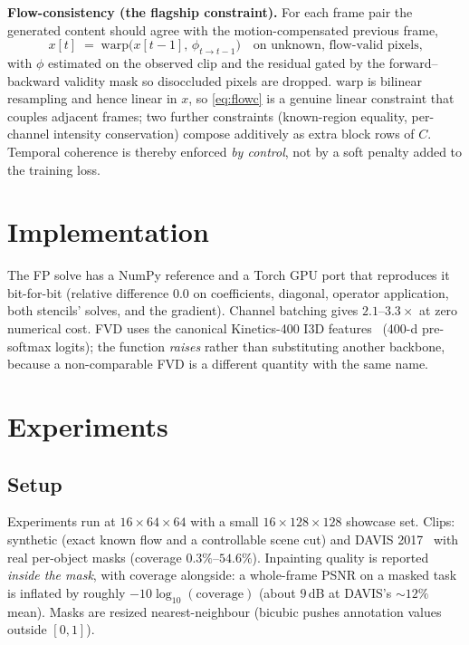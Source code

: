 \medskip\noindent\textbf{Flow-consistency (the flagship constraint).} For each
frame pair the generated content should agree with the motion-compensated
previous frame,
\begin{equation}
  x[t] \;=\; \mathrm{warp}\big(x[t{-}1],\,\phi_{t\to t-1}\big)
  \quad\text{on unknown, flow-valid pixels,}
  \label{eq:flowc}
\end{equation}
with $\phi$ estimated on the observed clip and the residual gated by the
forward--backward validity mask so disoccluded pixels are dropped. $\mathrm{warp}$
is bilinear resampling and hence linear in $x$, so \eqref{eq:flowc} is a genuine
linear constraint that couples adjacent frames; two further constraints
(known-region equality, per-channel intensity conservation) compose additively as
extra block rows of $C$. Temporal coherence is thereby enforced \emph{by control},
not by a soft penalty added to the training loss.

\section{Implementation}
The FP solve has a NumPy reference and a Torch GPU port that reproduces it
bit-for-bit (relative difference $0.0$ on coefficients, diagonal, operator
application, both stencils' solves, and the gradient). Channel batching gives
$2.1$--$3.3\times$ at zero numerical cost. FVD uses the canonical Kinetics-400
I3D features~\cite{carreira-2017-i3d,unterthiner-2018-fvd} (400-d pre-softmax
logits); the function \emph{raises} rather than substituting another backbone,
because a non-comparable FVD is a different quantity with the same name.

\section{Experiments}
\label{sec:exp}

\subsection{Setup}
Experiments run at $16\times64\times64$ with a small $16\times128\times128$
showcase set. Clips: synthetic (exact known flow and a controllable scene cut)
and DAVIS 2017~\cite{pont-tuset-2017-davis} with real per-object masks (coverage
$0.3\%$--$54.6\%$). Inpainting quality is reported \emph{inside the mask}, with
coverage alongside: a whole-frame PSNR on a masked task is inflated by roughly
$-10\log_{10}(\text{coverage})$ (about $9$\,dB at DAVIS's $\sim\!12\%$ mean).
Masks are resized nearest-neighbour (bicubic pushes annotation values outside
$[0,1]$).

